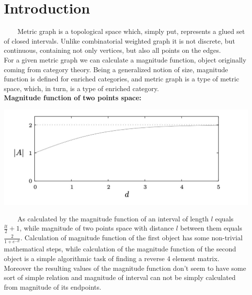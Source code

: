 \documentclass{article}
\begin{document}
\makeTitlePage

\tableofcontents


\section{Introduction}


\ \ \ \ Metric graph is a topological space which, simply put, represents a glued set 
of closed
intervals. Unlike combinatorial weighted graph it is not discrete, but 
continuous, containing not only
vertices, but also all points on the edges. \\

For a given metric graph we can calculate a magnitude function, object 
originally coming from category theory. Being a generalized notion of size,
magnitude function is defined for enriched categories, and metric graph is a type of metric space, which, in turn, is a type of enriched category. \\

\textbf{Magnitude function of two points space:}
\begin{center}
\includegraphics[width=.4\textwidth]{2dots}
\end{center}

\ \ \ \ As calculated by \textcite{Leinster_2012} the magnitude function of an interval of length $l$ equals $\frac{lt}{2} + 1$,
while magnitude of two points space with distance $l$ between them equals $\frac{2}{1 + e^{-lt}}$.
Calculation of magnitude function of the first object has some non-trivial mathematical steps,
while calculation of the magnitude function of the second object is a simple algorithmic task of finding a reverse 4 element matrix.  
Moreover the resulting values of the magnitude function don't seem to have some sort of simple relation and magnitude of interval can not be simply calculated from magnitude of its endpoints.\\ 
\end{document}
